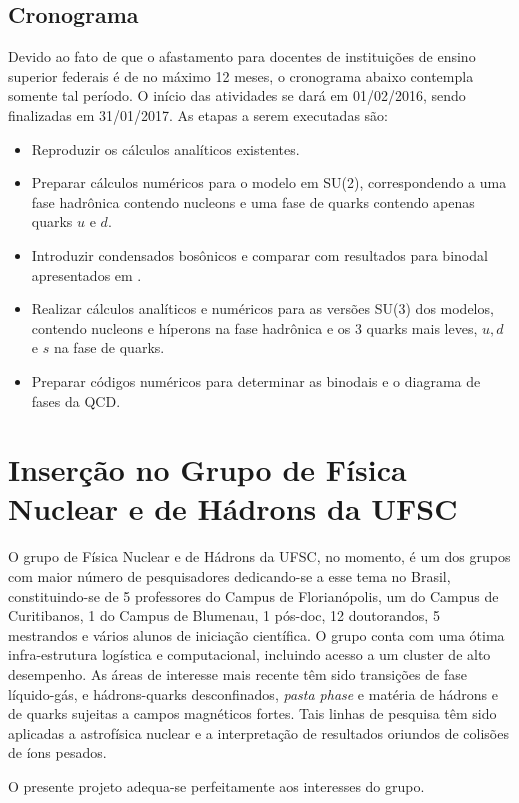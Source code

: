 \subsection{Cronograma}

Devido ao fato de que o afastamento para docentes de instituições de ensino superior federais é de no máximo 12 meses, o cronograma abaixo contempla somente tal período. O início das atividades se dará em 01/02/2016, sendo finalizadas em 31/01/2017. As etapas a serem executadas são:
\begin{itemize}
\item Reproduzir os cálculos analíticos existentes.
\item Preparar cálculos numéricos para o modelo em SU(2),
  correspondendo a uma fase hadrônica contendo nucleons e uma fase de
  quarks contendo apenas quarks $u$ e $d$.
\item Introduzir condensados bosônicos e comparar com resultados para
  binodal apresentados em \textcite{Rafael}.
\item Realizar cálculos analíticos e numéricos para as versões SU(3)
  dos modelos, contendo nucleons e híperons na fase hadrônica e os 3
  quarks mais leves, $u,d$ e $s$ na fase de quarks.
\item Preparar códigos numéricos para determinar as binodais e o
  diagrama de fases da QCD. 
\end{itemize}

\section{Inserção no Grupo de Física Nuclear e de Hádrons da UFSC}

O grupo de Física Nuclear e de Hádrons da UFSC, no momento, é um dos grupos
com maior número de pesquisadores dedicando-se a esse tema no Brasil,
constituindo-se de 5 professores do Campus de Florianópolis, um do Campus de
Curitibanos, 1 do Campus de Blumenau, 1 pós-doc, 12 doutorandos, 5 mestrandos e vários alunos de
iniciação científica. O grupo conta com uma ótima infra-estrutura logística e
computacional, incluindo acesso a um cluster de alto desempenho. As áreas
de interesse mais recente têm sido transições de fase líquido-gás,
e hádrons-quarks desconfinados, {\it pasta phase} e matéria de hádrons e de
quarks sujeitas a campos magnéticos fortes. Tais linhas de pesquisa têm sido
aplicadas a astrofísica nuclear e a interpretação de resultados oriundos de
colisões de íons pesados.

O presente projeto adequa-se perfeitamente aos interesses do grupo.

